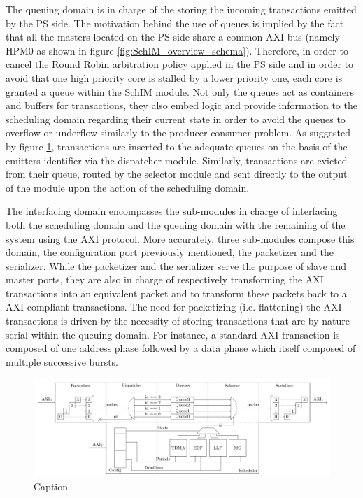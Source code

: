         The queuing domain is in charge of the storing the incoming transactions emitted by the PS side.
        The motivation behind the use of queues is implied by the fact that all the masters located on the PS side share a common AXI bus (namely HPM0 as shown in figure \ref{fig:SchIM_overview_schema}).
        Therefore, in order to cancel the Round Robin arbitration policy applied in the PS side and in order to avoid that one high priority core is stalled by a lower priority one, each core is granted a queue within the SchIM module.
        Not only the queues act as containers and buffers for transactions, they also embed logic and provide information to the scheduling domain regarding their current state in order to avoid the queues to overflow or underflow similarly to the producer-consumer problem.
        As suggested by figure \ref{fig:MemorEDF_module_schema}, transactions are inserted to the adequate queues on the basis of the emitters identifier via the dispatcher module.
        Similarly, transactions are evicted from their queue, routed by the selector module and sent directly to the output of the module upon the action of the scheduling domain.

        The interfacing domain encompasses the sub-modules in charge of interfacing both the scheduling domain and the queuing domain with the remaining of the system using the AXI protocol.
        More accurately, three sub-modules compose this domain, the configuration port previously mentioned, the packetizer and the serializer.
        While the packetizer and the serializer serve the purpose of slave and master ports, they are also in charge of respectively transforming the AXI transactions into an equivalent packet and to transform these packets back to a AXI compliant transactions.
        The need for packetizing (i.e. flattening) the AXI transactions is driven by the necessity of storing transactions that are by nature serial within the queuing domain.
        For instance, a standard AXI transaction is composed of one address phase followed by a data phase which itself composed of multiple successive bursts.

        \begin{figure}
            \centering
            \includegraphics[scale=0.08]{images/MemorEDF_module_schema.png}
            \caption{Caption}
            \label{fig:MemorEDF_module_schema}
        \end{figure}

